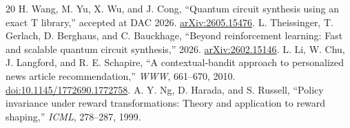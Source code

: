 \documentclass[11pt]{article}
\theoremstyle{definition}\newtheorem{definition}[theorem]{Definition}
\begin{document}
\begin{thebibliography}{20}
 H. Wang, M. Yu, X. Wu, and J. Cong, ``Quantum circuit synthesis using an exact T library,'' accepted at DAC 2026. \href{https://arxiv.org/abs/2605.15476}{arXiv:2605.15476}.
 L. Theissinger, T. Gerlach, D. Berghaus, and C. Bauckhage, ``Beyond reinforcement learning: Fast and scalable quantum circuit synthesis,'' 2026. \href{https://arxiv.org/abs/2602.15146}{arXiv:2602.15146}.
 L. Li, W. Chu, J. Langford, and R. E. Schapire, ``A contextual-bandit approach to personalized news article recommendation,'' \emph{WWW}, 661--670, 2010. \href{https://doi.org/10.1145/1772690.1772758}{doi:10.1145/1772690.1772758}.
 A. Y. Ng, D. Harada, and S. Russell, ``Policy invariance under reward transformations: Theory and application to reward shaping,'' \emph{ICML}, 278--287, 1999.
\end{thebibliography}
\end{document}
